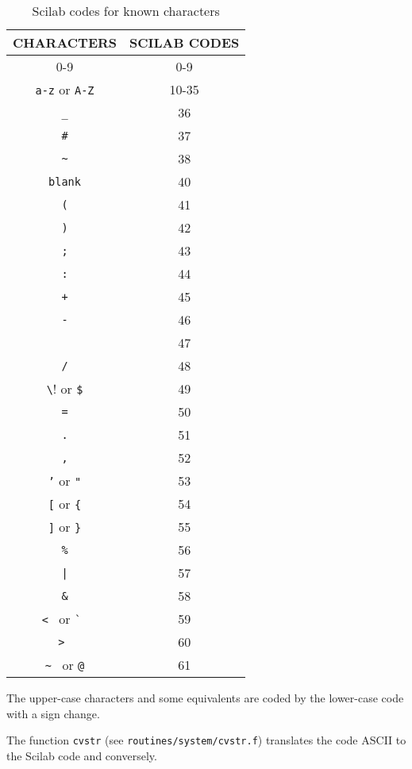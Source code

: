 \begin{table}[htbp]
\begin{center}
\begin{tabular}{|c|c|}
\hline
CHARACTERS & SCILAB CODES \\ \hline
0-9&0-9\\ \hline
{\tt a-z} or {\tt A-Z} & 10-35 \\ \hline
{\tt \_} & 36 \\ \hline
{\tt \#} & 37 \\ \hline
\verb!~! & 38 \\ \hline
{\tt blank} & 40 \\ \hline
{\tt (} & 41 \\ \hline
{\tt )} & 42 \\ \hline
{\tt ;} & 43 \\ \hline
{\tt :} & 44 \\ \hline
{\tt +} & 45 \\ \hline
{\tt -} & 46 \\ \hline
{\tt *} & 47 \\ \hline
\verb!/! & 48 \\ \hline
\verb!\! or \verb!$! & 49 \\ \hline
{\tt =} & 50 \\ \hline
{\tt .} & 51 \\ \hline
{\tt ,} & 52 \\ \hline
{\tt '} or {\tt "} & 53 \\ \hline
{\tt [} or {\tt \{} & 54 \\ \hline
{\tt ]} or {\tt \}} & 55 \\ \hline
{\tt \%} & 56 \\ \hline
\verb!|!& 57 \\ \hline
\verb!&! & 58 \\ \hline
\verb!< ! or \verb!` ! & 59 \\ \hline
\verb!> !  & 60 \\ \hline
\verb!~ ! or {\tt @} & 61  \\ \hline
\end{tabular}
\end{center}
\caption{Scilab codes for known characters}
\label{Scicodes}
\end{table}

The upper-case characters and some equivalents are coded by the lower-case 
code with a sign change.


The function {\tt cvstr} (see {\tt routines/system/cvstr.f}) translates 
the code ASCII to the Scilab code and conversely.

